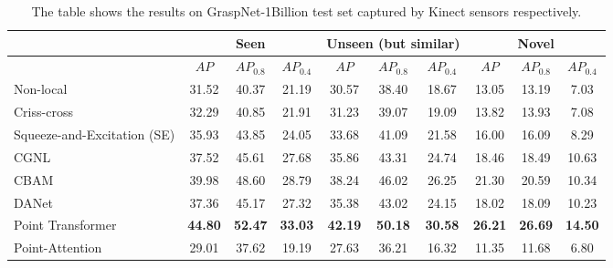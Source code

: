 \begin{table}[h]
\caption{The table shows the results on GraspNet-1Billion test set captured by Kinect sensors respectively.}
\label{tab:grasp_detect_eval_Kinect}
\begin{center}
\begin{tabular}{|l|c|c|c|c|c|c|c|c|c|}
\hline
& \multicolumn{3}{c|}{Seen} & \multicolumn{3}{c|}{Unseen (but similar)} & \multicolumn{3}{c|}{Novel} \\
\hline
& $AP$ & $AP_{0.8}$ & $AP_{0.4}$ & $AP$ & $AP_{0.8}$ & $AP_{0.4}$ & $AP$ & $AP_{0.8}$ & $AP_{0.4}$  \\
\hline
Non-local & 31.52 & 40.37 & 21.19 & 30.57 & 38.40 & 18.67 & 13.05 & 13.19 & 7.03 \\
\hline
Criss-cross & 32.29 & 40.85 & 21.91 & 31.23 & 39.07 & 19.09 & 13.82 & 13.93 & 7.08 \\
\hline
Squeeze-and-Excitation (SE) & 35.93 & 43.85 & 24.05 & 33.68 & 41.09 & 21.58 & 16.00 & 16.09 & 8.29 \\
\hline
CGNL & 37.52 & 45.61 & 27.68 & 35.86 & 43.31 & 24.74 & 18.46 & 18.49 & 10.63 \\
\hline
CBAM & 39.98 & 48.60 & 28.79 & 38.24 & 46.02 & 26.25 & 21.30 & 20.59 & 10.34 \\
\hline
DANet & 37.36 & 45.17 & 27.32 & 35.38 & 43.02 & 24.15 & 18.02 & 18.09 & 10.23 \\
\hline
Point Transformer & \textbf{44.80} & \textbf{52.47} & \textbf{33.03} & \textbf{42.19} & \textbf{50.18} & \textbf{30.58} & \textbf{26.21} & \textbf{26.69} & \textbf{14.50} \\
\hline
Point-Attention & 29.01 & 37.62 & 19.19 & 27.63 & 36.21 & 16.32 & 11.35 & 11.68 & 6.80 \\
\hline
\end{tabular}
\end{center}
\end{table}

